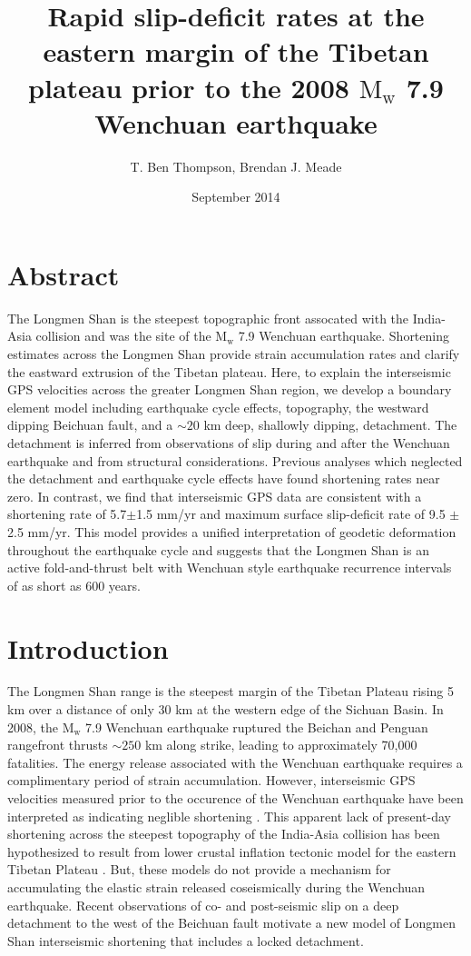 \documentclass[12pt]{article}
\title{Rapid slip-deficit rates at the eastern margin of the Tibetan plateau prior to the 2008 $\textrm{M}_\textrm{w}$ 7.9 Wenchuan earthquake}
\author{T. Ben Thompson, Brendan J. Meade}
\date{September 2014}
\begin{document}
\maketitle

\section{Abstract}
The Longmen Shan is the steepest topographic front assocated with the India-Asia collision and was the site of the $\textrm{M}_{\textrm{w}}$ 7.9  Wenchuan earthquake. Shortening estimates across the Longmen Shan provide strain accumulation rates and clarify the eastward extrusion of the Tibetan plateau. Here, to explain the interseismic GPS velocities across the greater Longmen Shan region, we develop a boundary element model including earthquake cycle effects, topography, the westward dipping Beichuan fault, and a ${\sim}20$ km deep, shallowly dipping, detachment. The detachment is inferred from observations of slip during and after the Wenchuan earthquake and from structural considerations. Previous analyses which neglected the detachment and earthquake cycle effects have found shortening rates near zero. In contrast, we find that interseismic GPS data are consistent with a shortening rate of 5.7$\pm$1.5 mm/yr and maximum surface slip-deficit rate of 9.5 $\pm$ 2.5 mm/yr. This model provides a unified interpretation of geodetic deformation throughout the earthquake cycle and suggests that the Longmen Shan is an active fold-and-thrust belt with Wenchuan style earthquake recurrence intervals of as short as 600 years.

\section{Introduction}
The Longmen Shan range is the steepest margin of the Tibetan Plateau rising 5 km over a distance of only 30 km at the western edge of the Sichuan Basin. In 2008, the $\textrm{M}_{\textrm{w}}$ 7.9 Wenchuan earthquake ruptured the Beichan and Penguan rangefront thrusts ${\sim}250$ km along strike, leading to approximately 70,000 fatalities. The energy release associated with the Wenchuan earthquake requires a complimentary period of strain accumulation. However, interseismic GPS velocities measured prior to the occurence of the Wenchuan earthquake have been interpreted as indicating neglible shortening \citep{king97, chen00, shen05, Meade07c, Loveless2011}. This apparent lack of present-day shortening across the steepest topography of the India-Asia collision has been hypothesized to result from lower crustal inflation tectonic model for the eastern Tibetan Plateau \citep{royden97, bird91, Burchfiel2008, Clark2000}.
But, these models do not provide a mechanism for accumulating the elastic strain released coseismically during the Wenchuan earthquake. Recent observations of co- and post-seismic slip on a deep detachment to the west of the Beichuan fault\citep{Qi2011, Fielding2013b} motivate a new model of Longmen Shan interseismic shortening that includes a locked detachment.
\end{document}
